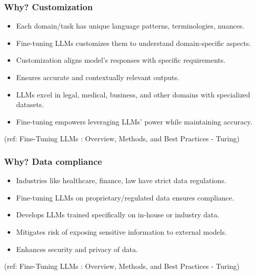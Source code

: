 \begin{frame}[fragile]\frametitle{Why? Customization}
  \begin{itemize}
    \item Each domain/task has unique language patterns, terminologies, nuances.
    \item Fine-tuning LLMs customizes them to understand domain-specific aspects.
    \item Customization aligns model's responses with specific requirements.
    \item Ensures accurate and contextually relevant outputs.
    \item LLMs excel in legal, medical, business, and other domains with specialized datasets.
    \item Fine-tuning empowers leveraging LLMs' power while maintaining accuracy.
  \end{itemize}
  
  {\tiny (ref: Fine-Tuning LLMs : Overview, Methods, and Best Practices - Turing)}
  
\end{frame}

\begin{frame}[fragile]\frametitle{Why? Data compliance}
  \begin{itemize}
    \item Industries like healthcare, finance, law have strict data regulations.
    \item Fine-tuning LLMs on proprietary/regulated data ensures compliance.
    \item Develops LLMs trained specifically on in-house or industry data.
    \item Mitigates risk of exposing sensitive information to external models.
    \item Enhances security and privacy of data.
  \end{itemize}
  
  {\tiny (ref: Fine-Tuning LLMs : Overview, Methods, and Best Practices - Turing)}
  
\end{frame}

